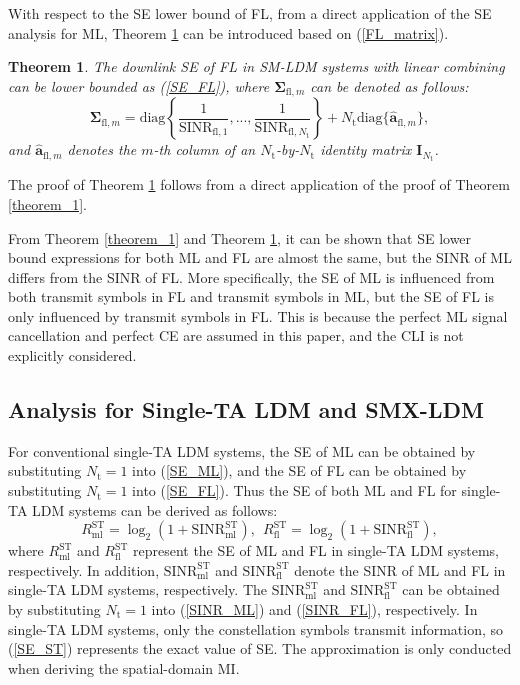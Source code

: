 \documentclass[journal]{IEEEtran}
\newtheorem{theorem}{\textbf{Theorem}}
\begin{document}
With respect to the SE lower bound of FL, from a direct application of the SE analysis for ML, Theorem \ref{theorem_2} can be introduced based on (\ref{FL_matrix}).
\begin{theorem}
The downlink SE of FL in SM-LDM systems with linear combining can be lower bounded as (\ref{SE_FL}), where $\mathbf{\Sigma}_{\text{fl},m}$ can be denoted as follows:
\begin{equation}
\mathbf{\Sigma}_{\text{fl},m} = \text{diag}\left\{\frac{1}{\text{SINR}_{\text{fl},1}}, ..., \frac{1}{\text{SINR}_{\text{fl},N_\text{t}}}\right\} + N_\text{t} \text{diag}\{\hat{\mathbf{a}}_{\text{fl},m}\},
\label{Sigma_FL}
\end{equation}
and $\hat{\mathbf{a}}_{\text{fl},m}$ denotes the $m$-th column of an $N_\text{t}$-by-$N_\text{t}$ identity matrix $\mathbf{I}_{N_\text{t}}$.
\label{theorem_2}
\end{theorem}

\begin{IEEEproof}
The proof of Theorem \ref{theorem_2} follows from a direct application of the proof of Theorem \ref{theorem_1}.
\end{IEEEproof}

From Theorem \ref{theorem_1} and Theorem \ref{theorem_2}, it can be shown that SE lower bound expressions for both ML and FL are almost the same, but the SINR of ML differs from the SINR of FL. More specifically, the SE of ML is influenced from both transmit symbols in FL and transmit symbols in ML, but the SE of FL is only influenced by transmit symbols in FL. This is because the perfect ML signal cancellation and perfect CE are assumed in this paper, and the CLI is not explicitly considered.

\subsection{Analysis for Single-TA LDM and SMX-LDM}
For conventional single-TA LDM systems, the SE of ML can be obtained by substituting $N_\text{t} = 1$ into (\ref{SE_ML}), and the SE of FL can be obtained by substituting $N_\text{t} = 1$ into (\ref{SE_FL}). Thus the SE of both ML and FL for single-TA LDM systems can be derived as follows:
\begin{equation}
R_\text{ml}^\text{ST} = \log_2\left(1+\text{SINR}_\text{ml}^\text{ST}\right), \ \
R_\text{fl}^\text{ST} = \log_2\left(1+\text{SINR}_\text{fl}^\text{ST}\right),
\label{SE_ST}
\end{equation}
where $R_\text{ml}^\text{ST}$ and $R_\text{fl}^\text{ST}$ represent the SE of ML and FL in single-TA LDM systems, respectively. In addition, $\text{SINR}_\text{ml}^\text{ST}$ and $\text{SINR}_\text{fl}^\text{ST}$ denote the SINR of ML and FL in single-TA LDM systems, respectively. The $\text{SINR}_\text{ml}^\text{ST}$ and $\text{SINR}_\text{fl}^\text{ST}$ can be obtained by substituting $N_\text{t} = 1$ into (\ref{SINR_ML}) and (\ref{SINR_FL}), respectively. In single-TA LDM systems, only the constellation symbols transmit information, so (\ref{SE_ST}) represents the exact value of SE. The approximation is only conducted when deriving the spatial-domain MI.
\end{document}
